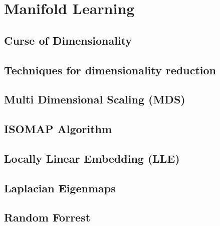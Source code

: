 
\section*{Manifold Learning}

\subsection*{Curse of Dimensionality}
\subsection*{Techniques for dimensionality reduction}
\subsection*{Multi Dimensional Scaling (MDS)}
\subsection*{ISOMAP Algorithm}
\subsection*{Locally Linear Embedding (LLE)}
\subsection*{Laplacian Eigenmaps}
\subsection*{Random Forrest}


